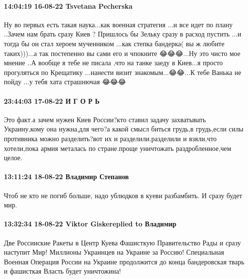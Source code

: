  
 
 
 
 

\paragraph{14:04:19 16-08-22 Tsvetana Pecherska}

Ну во первых есть такая наука...как военная стратегия ...и все идет по плану
..Зачем нам брать сразу Киев  ? Пришлось бы Зельку сразу в расход пустить ...и
тогда бы он стал хероем мученником ...как степка бандерка( вы ж любите
таких)))...а так постепенно вы сами его и чпокните 😂😂😂...Ну это чисто мое
мнение ..А вообще я тебе не писала ,что на танке заеду в Киев...я просто
прогуляться по Крещатику ...нанести визит знакомым...😂😂...К тебе Ванька не
пойду ...у тебя хата страшнючая 😂😂😂

\paragraph{23:44:03 17-08-22 И Г О Р Ь}

Это факт.а зачем нужен Киев России?кто ставил задачу захватывать Украину,кому
она нужна,для чего?а какой смысл биться грудь,в грудь,если силы противника
можно разделить?вот их и разделили.разделили и взяли,что хотели,пока армия
металась по стране.проще уничтожать раздробленное,чем целое.

\paragraph{13:11:24 18-08-22 Владимир Степанов}

Чтоб не кто не погиб больше, надо ублюдков в куеви разбамбить. И сразу будет
мир.

\paragraph{13:32:34 18-08-22 Viktor Giskereplied to Владимир}

Две Россииские Ракеты в Центр Куева Фашисткую Правительство Рады и сразу
наступит Мир! Миллионы Украинцев на Украине за Россию! Специальная Военная
Операция России на Украине продолжится до конца бандеровская тварь и фашисткая
Власть будет уничтожина!

